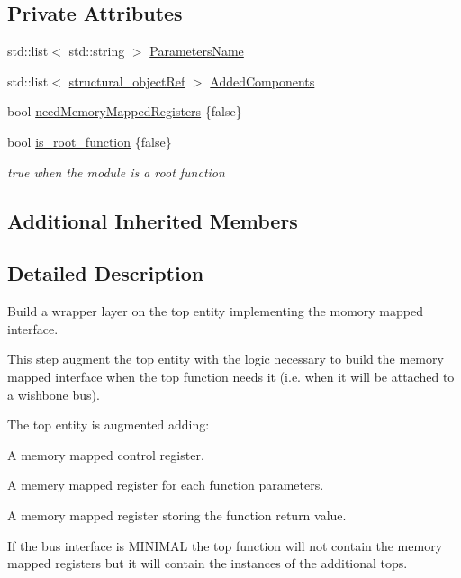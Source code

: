 \subsection*{Private Attributes}
\begin{DoxyCompactItemize}
\item 
std\+::list$<$ std\+::string $>$ \hyperlink{classTopEntityMemoryMapped_ad6fe502daf2be3bfce8ed230d6c80685}{Parameters\+Name}
\item 
std\+::list$<$ \hyperlink{structural__objects_8hpp_a8ea5f8cc50ab8f4c31e2751074ff60b2}{structural\+\_\+object\+Ref} $>$ \hyperlink{classTopEntityMemoryMapped_ad5da69311efe3e70b80af56068179c0d}{Added\+Components}
\item 
bool \hyperlink{classTopEntityMemoryMapped_a07bad75b9cd36d3c1148b0872a09d974}{need\+Memory\+Mapped\+Registers} \{false\}
\item 
bool \hyperlink{classTopEntityMemoryMapped_a584c8bf5240e1347466bd161368b7312}{is\+\_\+root\+\_\+function} \{false\}
\begin{DoxyCompactList}\small\item\em true when the module is a root function \end{DoxyCompactList}\end{DoxyCompactItemize}
\subsection*{Additional Inherited Members}


\subsection{Detailed Description}
Build a wrapper layer on the top entity implementing the momory mapped interface. 

This step augment the top entity with the logic necessary to build the memory mapped interface when the top function needs it (i.\+e. when it will be attached to a wishbone bus).

The top entity is augmented adding\+:
\begin{DoxyItemize}
\item A memory mapped control register.
\item A memery mapped register for each function parameters.
\item A memory mapped register storing the function return value.
\end{DoxyItemize}

If the bus interface is M\+I\+N\+I\+M\+AL the top function will not contain the memory mapped registers but it will contain the instances of the additional tops. 

